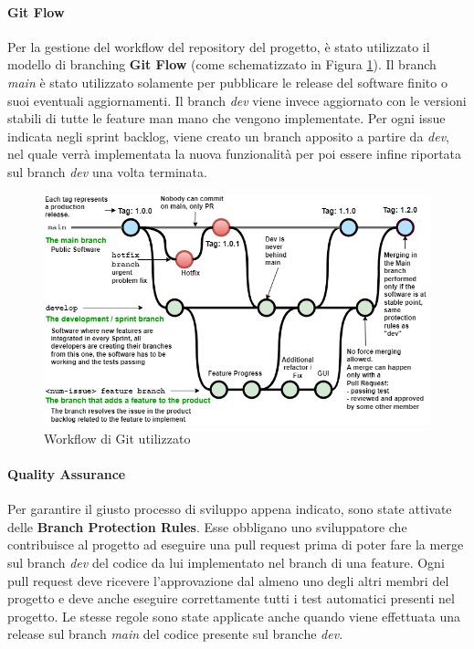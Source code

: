     \paragraph{Git Flow}
    Per la gestione del workflow del repository del progetto, è stato utilizzato il modello di branching \textbf{Git Flow} (come schematizzato in Figura \ref{fig:git-flow}). Il branch \textit{main} è stato utilizzato solamente per pubblicare le release del software finito o suoi eventuali aggiornamenti. Il branch \textit{dev} viene invece aggiornato con le versioni stabili di tutte le feature man mano che vengono implementate. Per ogni issue indicata negli sprint backlog, viene creato un branch apposito a partire da \textit{dev}, nel quale verrà implementata la nuova funzionalità per poi essere infine riportata sul branch \textit{dev} una volta terminata.
        \begin{figure}[H]
            \centering
            \includegraphics[width=1\textwidth]{Images/git-flow.png}
            \caption{Workflow di Git utilizzato}
            \label{fig:git-flow}
        \end{figure}

    \paragraph{Quality Assurance}
    Per garantire il giusto processo di sviluppo appena indicato, sono state attivate delle \textbf{Branch Protection Rules}. Esse obbligano uno sviluppatore che contribuisce al progetto ad eseguire una pull request prima di poter fare la merge sul branch \textit{dev} del codice da lui implementato nel branch di una feature. 
    Ogni pull request deve ricevere l'approvazione dal almeno uno degli altri membri del progetto e deve anche eseguire correttamente tutti i test automatici presenti nel progetto. Le stesse regole sono state applicate anche quando viene effettuata una release sul branch \textit{main} del codice presente sul branche \textit{dev}.

